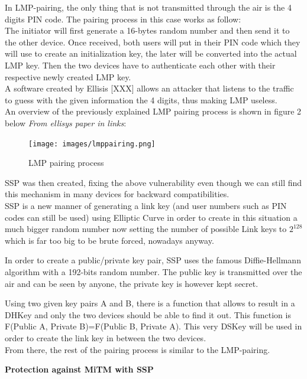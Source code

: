 In LMP-pairing, the only thing that is not transmitted through the air is the 4 digits PIN code. The pairing process in this case works as follow: \\
The initiator will first generate a 16-bytes random number and then send it to the other device. Once received, both users will put in their PIN code which they will use to create an initialization key, the later will be converted into the actual LMP key. Then the two devices have to authenticate each other with their respective newly created LMP key. \\
A software created by Ellisis [XXX] allows an attacker that listens to the traffic to guess with the given information the 4 digits, thus making LMP useless. \\
An overview of the previously explained LMP pairing process is shown in figure 2 below \textit{From ellisys paper in links}: 
\begin{figure}[!h]
  \begin{center}
	\texttt{[image: images/lmppairing.png]}
	\label{LMP pairing}
	\caption{LMP pairing process}
  \end{center}
\end{figure}


SSP was then created, fixing the above vulnerability even though we can still find this mechanism in many devices for backward compatibilities. \\
SSP is a new manner of generating a link key (and user numbers such as PIN codes can still be used) using Elliptic Curve in order to create in this situation a much bigger random number now setting the number of possible Link keys to \(2^{128}\) which is far too big to be brute forced, nowadays anyway. 

In order to create a public/private key pair, SSP uses the famous Diffie-Hellmann algorithm with a 192-bits random number. The public key is transmitted over the air and can be seen by anyone, the private key is however kept secret. 

Using two given key pairs A and B, there is a function that allows to result in a DHKey and only the two devices should be able to find it out. This function is F(Public A, Private B)=F(Public B, Private A). This very DSKey will be used in order to create the link key in between the two devices. \\ 
From there, the rest of the pairing process is similar to the LMP-pairing.


\textbf{Protection against MiTM with SSP}

